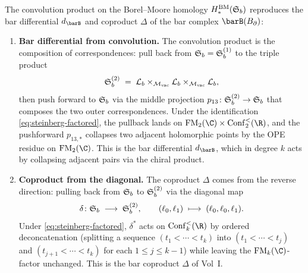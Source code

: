\begin{conjecture}
\label{conj:convolution-bar}
The convolution product on the Borel--Moore homology
$H_*^{\mathrm{BM}}(\mathfrak{S}_b)$ reproduces the bar differential $d_{\barB}$
and coproduct $\Delta$ of the bar complex $\barB(\Bbound)$:
\begin{enumerate}[label=\textup{(\roman*)},leftmargin=2em]
\item \textbf{Bar differential from convolution.}
 The convolution product is the composition of correspondences:
 pull back from $\mathfrak{S}_b = \mathfrak{S}_b^{(1)}$ to the triple
 product
 \[
 \mathfrak{S}_b^{(2)}
 \;=\;
 \mathcal L_b \times_{\mathcal M_{\mathrm{vac}}} \mathcal L_b
 \times_{\mathcal M_{\mathrm{vac}}} \mathcal L_b,
 \]
 then push forward to $\mathfrak{S}_b$ via the middle projection
 $p_{13} \colon \mathfrak{S}_b^{(2)} \to \mathfrak{S}_b$ that composes
 the two outer correspondences. Under the identification
 \eqref{eq:steinberg-factored}, the pullback lands on
 $\FM_2(\C) \times \Conf_2^{<}(\R)$, and the pushforward
 $p_{13,*}$ collapses two adjacent holomorphic points by the
 OPE residue on $\FM_2(\C)$. This is the bar
 differential $d_{\barB}$, which in degree $k$ acts by
 collapsing adjacent pairs via the chiral product.

\item \textbf{Coproduct from the diagonal.}
 The coproduct $\Delta$ comes from the reverse direction: pulling
 back from $\mathfrak{S}_b$ to $\mathfrak{S}_b^{(2)}$ via the diagonal
 map
 \[
 \delta \colon \mathfrak{S}_b \;\longrightarrow\; \mathfrak{S}_b^{(2)},
 \qquad
 (\ell_0, \ell_1)
 \;\longmapsto\;
 (\ell_0, \ell_0, \ell_1).
 \]
 Under \eqref{eq:steinberg-factored}, $\delta^*$ acts on
 $\Conf_k^{<}(\R)$ by ordered deconcatenation (splitting a
 sequence $(t_1 < \cdots < t_k)$ into
 $(t_1 < \cdots < t_j)$ and $(t_{j+1} < \cdots < t_k)$ for
 each $1 \le j \le k-1$) while leaving the $\FM_k(\C)$-factor
 unchanged. This is the bar coproduct $\Delta$ of Vol~I.
\end{enumerate}
\end{conjecture}

